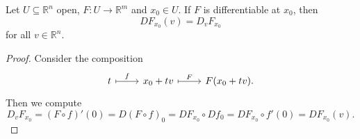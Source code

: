 \begin{proposition}
	\label{prop:computing_differential_via_directional_derivative}
	Let $U \subseteq \mathbb{R}^n$ open, $F : U \to \mathbb{R}^m$ and $x_0 \in U$. If $F$ is differentiable at $x_0$, then 
	\begin{equation*}
		DF_{x_0}(v) = D_vF_{x_0}
	\end{equation*}
	\noindent for all $v \in \mathbb{R}^n$.
\end{proposition}

\begin{proof}
	Consider the composition
	\begin{equation*}
		\begin{tikzcd}
			t \arrow[r,maps to,"f"] & x_0 + tv \arrow[r,maps to,"F"] & F(x_0 + tv).
		\end{tikzcd}
	\end{equation*}
	Then we compute
	\begin{equation*}
		D_vF_{x_0} = (F \circ f)'(0) = D(F \circ f)_0 = DF_{x_0} \circ Df_0 = DF_{x_0} \circ f'(0) = DF_{x_0}(v).
	\end{equation*}
\end{proof}
